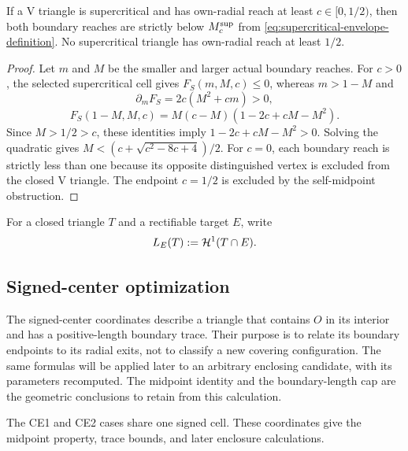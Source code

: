 \begin{lemma}
\label{lem:strict-supercritical-envelope}
If a V triangle is supercritical and has own-radial reach at least
$c\in[0,1/2)$, then both boundary reaches are strictly below
$M_c^{\rm sup}$ from \eqref{eq:supercritical-envelope-definition}.
No supercritical triangle has own-radial reach at least $1/2$.
\end{lemma}
\begin{proof}
Let $m$ and $M$ be the smaller and larger actual boundary reaches.
For $c>0$, the selected supercritical cell gives $F_S(m,M,c)\le0$,
whereas $m>1-M$ and
\[
 \partial_m F_S=2c(M^2+cm)>0,
\]
\[
 F_S(1-M,M,c)=M(c-M)(1-2c+cM-M^2).
\]
Since $M>1/2>c$, these identities imply
$1-2c+cM-M^2>0$. Solving the quadratic gives
$M<(c+\sqrt{c^2-8c+4})/2$.
For $c=0$, each boundary reach is strictly less than one because its
opposite distinguished vertex is excluded from the closed V triangle.
The endpoint $c=1/2$ is excluded by the self-midpoint obstruction.
\end{proof}

For a closed triangle $T$ and a rectifiable target $E$, write
\[
 L_E(T):=\mathcal H^1(T\cap E).
\]

\subsection{Signed-center optimization}

The signed-center coordinates describe a triangle that contains $O$ in
its interior and has a positive-length boundary trace. Their purpose is to relate its boundary endpoints to
its radial exits, not to classify a new covering configuration. The same
formulas will be applied later to an arbitrary enclosing candidate, with
its parameters recomputed. The midpoint identity and the boundary-length
cap are the geometric conclusions to retain from this calculation.

\label{sec:signed-ce12-reductions}

The CE1 and CE2 cases share one signed cell. These coordinates give
the midpoint property, trace bounds, and later enclosure calculations.

